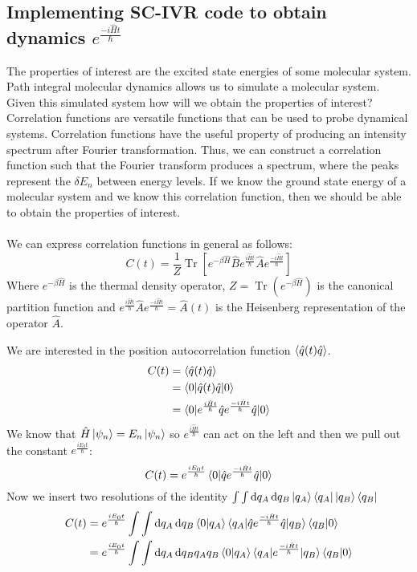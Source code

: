 \documentclass[12pt,letterpaper,oneside,final,titlepage]{article}               %
\numberwithin{equation}{section} %
\newcommand{\eBH}{e^{-\beta\hat{H}}}
\newcommand{\emiHt}{e^{\frac{-i\hat{H}t}{\hbar}}}
\newcommand{\eiHt}{e^{\frac{i\hat{H}t}{\hbar}}}
\DeclareMathOperator{\Tr}{Tr}
\begin{document}
\subsection{Implementing SC-IVR code to obtain dynamics $\emiHt$} 
The properties of interest are the excited state energies of some molecular system. 
Path integral molecular dynamics allows us to simulate a molecular system. 
Given this simulated system how will we obtain the properties of interest?
Correlation functions are versatile functions that can be used to probe dynamical systems.
Correlation functions have the useful property of producing an intensity spectrum after Fourier transformation.
Thus, we can construct a correlation function such that the Fourier transform produces a spectrum, where the peaks
represent the $\delta E_{n}$ between energy levels.
If we know the ground state energy of a molecular system and we know this correlation function, then we should be able to obtain the properties of interest. \\ \\
We can express correlation functions in general as follows:
\begin{equation}
    C(t) = \frac{1}{Z}\Tr[\eBH\hat{B}\eiHt\hat{A}\emiHt]
\end{equation}
Where $\eBH$ is the thermal density operator, $Z = \Tr(\eBH)$ is the canonical partition function 
and $\eiHt\hat{A}\emiHt=\hat{A}(t)$ is the Heisenberg representation of the operator $\hat{A}$.

We are interested in the position autocorrelation function $\braket{\hat{q}(t)\hat{q}}$. 
\begin{align}
    C(t) &= \braket{\hat{q}(t)\hat{q}}
    \\   &= \braket{0|\hat{q}(t)\hat{q}|0}
    \\   &= \braket{0|\eiHt\hat{q}\emiHt\hat{q}|0}
\end{align}
We know that $\hat{H}\ket{\psi_{n}} = E_{n}\ket{\psi_{n}}$ so $\eiHt$ can act on the left and 
then we pull out the constant $e^{\frac{iE_{0}t}{\hbar}}$:\\
\begin{equation}
    C(t) = e^{\frac{iE_{0}t}{\hbar}}\braket{0|\hat{q}\emiHt\hat{q}|0}
\end{equation}
Now we insert two resolutions of the identity
$\int\int \dif q_{A}\dif q_{B} \ket{q_{A}}\bra{q_{A}}\ket{q_{B}}\bra{q_{B}}$
\begin{align}
    C(t) &= e^{\frac{iE_{0}t}{\hbar}}\int\int \dif q_{A}\dif q_{B} 
    \braket{0|q_{A}}\braket{q_{A}|\hat{q}\emiHt\hat{q}|q_{B}}\braket{q_{B}|0}
    \\   &= e^{\frac{iE_{0}t}{\hbar}}\int\int \dif q_{A}\dif q_{B} 
    q_{A}q_{B}\braket{0|q_{A}}\braket{q_{A}|\emiHt|q_{B}}\braket{q_{B}|0}
    \label{eq:cor_ins}
\end{align}
\end{document}
